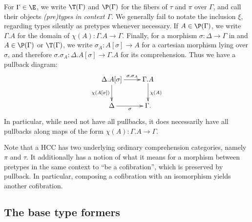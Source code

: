 \documentclass{amsart}
\begin{document}
For $\Gamma\in\E$, we write $\T(\Gamma)$ and $\P(\Gamma)$ for the fibers of $\tau$ and $\pi$ over $\Gamma$, and call their objects \emph{(pre)types in context $\Gamma$}.
We generally fail to notate the inclusion $\xi$, regarding types silently as pretypes whenever necessary.
If $A\in \P(\Gamma)$, we write $\Gamma.A$ for the domain of $\chi(A): \Gamma.A \to \Gamma$.
Finally, for a morphism $\sigma : \Delta \to \Gamma$ in \E and $A\in\P(\Gamma)$ or $\T(\Gamma)$, we write $\sigma_A : A[\sigma] \to A$ for a cartesian morphism lying over $\sigma$, and therefore $\sigma.\sigma_A : \Delta.A[\sigma] \to \Gamma.A$ for its comprehension.
Thus we have a pullback diagram:
\begin{equation}
  \vcenter{\xymatrix{
      \Delta.A[\sigma]\ar[r]^-{\sigma.\sigma_A} \ar[d]_{\chi(A[\sigma])} &
      \Gamma.A\ar[d]^{\chi(A)}\\
      \Delta \ar[r]_\sigma &
      \Gamma.
      }}
\end{equation}
In particular, while \E need not have all pullbacks, it does necessarily have all pullbacks along maps of the form $\chi(A) : \Gamma.A \to \Gamma$.

Note that a HCC has two underlying ordinary comprehension categories, namely $\pi$ and $\tau$.
It additionally has a notion of what it means for a morphism between pretypes in the same context to ``be a cofibration'', which is preserved by pullback.
In particular, composing a cofibration with an isomorphism yields another cofibration.


\subsection{The base type formers}
\label{sec:base-type-formers}
\end{document}
